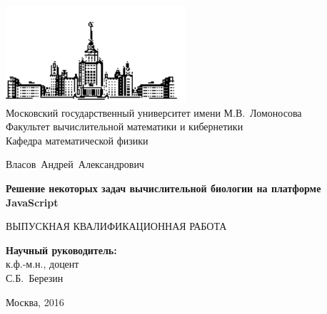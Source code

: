 \documentclass[oneside,final,14pt]{extreport}
\begin{document}
\begin{titlepage}
\begin{spacing}{0.9}
\thispagestyle{empty}
\begin{center}
\vspace{-4cm}

\includegraphics[width=0.5\textwidth]{msu}\\
{Московский государственный университет имени М.В.~Ломоносова}\\
Факультет вычислительной математики и кибернетики\\
Кафедра математической физики

\vspace{5cm}

{\Large Власов~Андрей~Александрович}

\vspace{1cm}

{\Large\bfseries
Решение некоторых задач вычислительной биологии на платформе JavaScript\\}

\vspace{1cm}

{\large ВЫПУСКНАЯ КВАЛИФИКАЦИОННАЯ РАБОТА}
\end{center}

\vfill

\begin{flushright}
  \textbf{Научный руководитель:}\\
  к.ф.-м.н., доцент\\
  С.Б.~Березин
\end{flushright}

\vfill

\begin{center}
Москва, 2016
\end{center}

\enlargethispage{4\baselineskip}
\end{spacing}
\end{titlepage}
\setcounter{page}{2}

\begin{spacing}{0.9}
\tableofcontents
\end{spacing}
\end{document}
